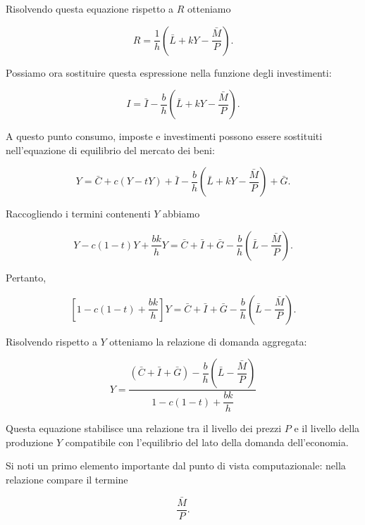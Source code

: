 Risolvendo questa equazione rispetto a $R$ otteniamo

\begin{equation*}
    R=
    \frac{1}{h}
    \left(
        \bar{L}+kY-\frac{\bar{M}}{P}
    \right).
    \label{eq:adas_R}
\end{equation*}

Possiamo ora sostituire questa espressione nella funzione degli
investimenti:

\begin{equation*}
    I
    =
    \bar{I}
    -
    \frac{b}{h}
    \left(
        \bar{L}+kY-\frac{\bar{M}}{P}
    \right).
\end{equation*}

A questo punto consumo, imposte e investimenti possono essere
sostituiti nell'equazione di equilibrio del mercato dei beni:

\begin{equation*}
Y
=
\bar{C}
+c(Y-tY)
+\bar{I}
-\frac{b}{h}
\left(
    \bar{L}+kY-\frac{\bar{M}}{P}
\right)
+\bar{G}.
\end{equation*}

Raccogliendo i termini contenenti $Y$ abbiamo

\begin{equation*}
Y-c(1-t)Y+\frac{bk}{h}Y
=
\bar{C}+\bar{I}+\bar{G}
-\frac{b}{h}
\left(
    \bar{L}-\frac{\bar{M}}{P}
\right).
\end{equation*}

Pertanto,

\begin{equation*}
\left[
1-c(1-t)+\frac{bk}{h}
\right]Y
=
\bar{C}+\bar{I}+\bar{G}
-\frac{b}{h}
\left(
    \bar{L}-\frac{\bar{M}}{P}
\right).
\end{equation*}

Risolvendo rispetto a $Y$ otteniamo la relazione di domanda
aggregata:

\begin{equation}
Y=
\frac{
(\bar{C}+\bar{I}+\bar{G})
-\dfrac{b}{h}
\left(
\bar{L}-\dfrac{\bar{M}}{P}
\right)
}{
1-c(1-t)+\dfrac{bk}{h}
}
\label{eq:AD}
\end{equation}

Questa equazione stabilisce una relazione tra il livello dei prezzi
$P$ e il livello della produzione $Y$ compatibile con l'equilibrio
del lato della domanda dell'economia.

Si noti un primo elemento importante dal punto di vista
computazionale: nella relazione compare il termine

\begin{equation*}
    \frac{\bar{M}}{P}.
\end{equation*}

